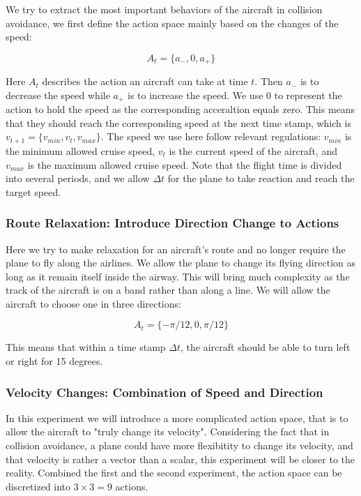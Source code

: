 We try to extract the most important behaviors of the aircraft in collision avoidance, we first define the action space mainly based on the changes of the speed:

$$
A_t = \{a_-, 0, a_+\}
$$

Here $A_t$ describes the action an aircraft can take at time $t$. Then $a_-$ is to decrease the speed while $a_+$ is to increase the speed. We use $0$ to represent the action to hold the speed as the corresponding acceraltion equals zero. This means that they should reach the corresponding speed at the next time stamp, which is $v_{t+1}=\{v_{min},v_{t},v_{max}\}$. The speed we use here follow relevant regulations: $v_{min}$ is the minimum allowed cruise speed, $v_{t}$ is the current speed of the aircraft, and $v_{max}$ is the maximum allowed cruise speed. Note that the flight time is divided into several periods, and we allow $\Delta t$ for the plane to take reaction and reach the target speed.

\subsubsection{Route Relaxation: Introduce Direction Change to Actions}

Here we try to make relaxation for an aircraft's route and no longer require the plane to fly along the airlines. We allow the plane to change its flying direction as long as it remain itself inside the airway. This will bring much complexity as the track of the aircraft is on a band rather than along a line. We will allow the aircraft to choose one in three directions:

$$
A_t = \{-\pi / 12, 0, \pi / 12\}
$$

This means that within a time stamp $\Delta t$, the aircraft should be able to turn left or right for 15 degrees.

\subsubsection{Velocity Changes: Combination of Speed and Direction}

In this experiment we will introduce a more complicated action space, that is to allow the aircraft to "truly change its velocity". Considering the fact that in collision avoidance, a plane could have more flexibitity to change its velocity, and that velocity is rather a vector than a scalar, this experiment will be closer to the reality. Combined the first and the second experiment, the action space can be discretized into $3 \times 3 = 9$ actions.

